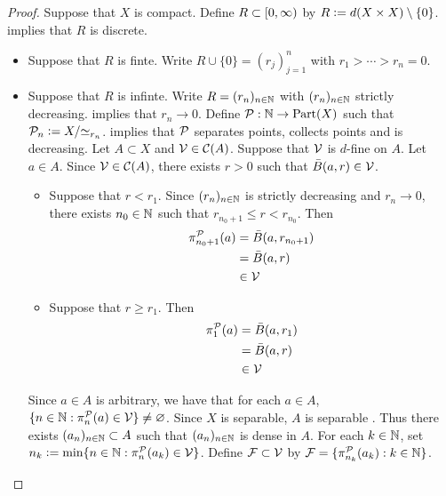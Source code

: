 \documentclass{book}
\begin{document}
	\begin{proof}
		Suppose that $X$ is compact. Define $R \subset [0,\infty)$ by $R \vcentcolon= d(X \times X) \setminus \{0\}$.  implies that $R$ is discrete. 
		\begin{itemize}
			\item Suppose that $R$ is finte. Write $R \cup \{0\} = (r_j)_{j=1}^n$ with $r_1 > \cdots > r_n = 0$.  
			\item Suppose that $R$ is infinte. Write $R = (r_n)_{n \in \mathbb{N}}$ with $(r_n)_{n \in \mathbb{N}}$ strictly decreasing.  implies that $r_n \rightarrow 0$. Define $\mathcal{P}: \mathbb{N} \rightarrow \operatorname*{\text{Part}}(X)$ such that $\mathcal{P}_n \vcentcolon= X / {\simeq_{r_n}}$.  implies that $\mathcal{P}$ separates points, collects points and is decreasing. Let $A \subset X$ and $\mathcal{V} \in \mathcal{C}(A)$. Suppose that $\mathcal{V}$ is $d$-fine on $A$. Let $a \in A$. Since $\mathcal{V} \in \mathcal{C}(A)$, there exists $r > 0$ such that $\bar{B}(a, r) \in \mathcal{V}$. 
			\begin{itemize}
				\item Suppose that $r < r_1$. Since $(r_n)_{n \in \mathbb{N}}$ is strictly decreasing and $r_n \rightarrow 0$, there exists $n_0 \in \mathbb{N}$ such that $r_{n_0 + 1} \leq r < r_{n_0}$. Then  
				\begin{align*}
					\pi^{\mathcal{P}}_{n_0+1}(a)
					& = \bar{B}(a, r_{n_0+1}) \\
					& = \bar{B}(a, r) \\
					& \in \mathcal{V} 
				\end{align*}
				\item Suppose that $r \geq r_1$. Then 
				\begin{align*}
					\pi^{\mathcal{P}}_1(a)
					& = \bar{B}(a, r_1) \\
					& = \bar{B}(a, r) \\
					& \in \mathcal{V} 
				\end{align*}
			\end{itemize}
			Since $a \in A$ is arbitrary, we have that for each $a \in A$, $\{n \in \mathbb{N}: \pi^{\mathcal{P}}_n(a) \in \mathcal{V} \} \neq \varnothing$. Since $X$ is separable, $A$ is separable . Thus there exists $(a_n)_{n \in \mathbb{N}} \subset A$ such that $(a_n)_{n \in \mathbb{N}}$ is dense in $A$. For each $k \in \mathbb{N}$, set $n_k \vcentcolon= \min \{n \in \mathbb{N}: \pi^{\mathcal{P}}_n(a_k) \in \mathcal{V} \}$. Define $\mathcal{F} \subset \mathcal{V}$ by $\mathcal{F} = \{\pi^{\mathcal{P}}_{n_k}(a_k): k \in \mathbb{N}\}$. 
			\begin{enumerate}

\end{enumerate}
\end{itemize}
\end{proof}
\end{document}
